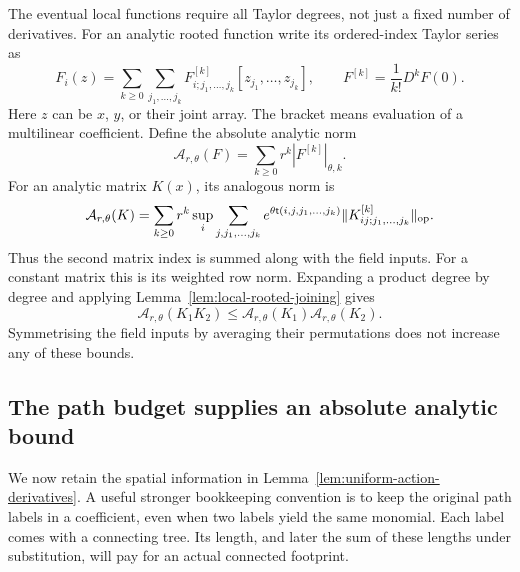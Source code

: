 \documentclass[11pt,reqno]{amsart}
\numberwithin{equation}{section}
\theoremstyle{definition}
\theoremstyle{remark}
\begin{document}
The eventual local functions require all Taylor
degrees, not just a fixed number of derivatives.
For an analytic rooted function write its ordered-index
Taylor series as
\[
 F_i(z)=\sum_{k\ge0}\sum_{j_1,\ldots,j_k}
       F^{[k]}_{i;j_1,\ldots,j_k}
                         [z_{j_1},\ldots,z_{j_k}],
 \qquad
 F^{[k]}=\frac1{k!}D^kF(0).
\]
Here \(z\) can be \(x\), \(y\), or their joint array.
The bracket means evaluation of a multilinear coefficient.
Define the absolute analytic norm
\begin{equation}
             \mathcal A_{r,\theta}(F)
                  =\sum_{k\ge0}r^k|F^{[k]}|_{\theta,k}.
 \label{eq:local-analytic-norm}
\end{equation}
For an analytic matrix \(K(x)\), its analogous norm is
\begin{equation}
 \mathcal A_{r,\theta}(K)
  =\sum_{k\ge0}r^k\sup_i
     \sum_{j,j_1,\ldots,j_k}
       e^{\theta\mathsf t(i,j,j_1,\ldots,j_k)}
                    \|K^{[k]}_{ij;j_1,\ldots,j_k}\|_{\rm op}.
 \label{eq:local-analytic-matrix}
\end{equation}
Thus the second matrix index is summed along with the
field inputs. For a constant matrix this is its
weighted row norm.
Expanding a product degree by degree and applying
Lemma~\ref{lem:local-rooted-joining} gives
\begin{equation}
 \mathcal A_{r,\theta}(K_1K_2)
        \le\mathcal A_{r,\theta}(K_1)
                             \mathcal A_{r,\theta}(K_2).
 \label{eq:local-analytic-product}
\end{equation}
Symmetrising the field inputs by averaging their
permutations does not increase any of these bounds.

\subsection{The path budget supplies an absolute analytic bound}

We now retain the spatial information in
Lemma~\ref{lem:uniform-action-derivatives}.
A useful stronger bookkeeping convention is to keep
the original path labels in a coefficient, even when
two labels yield the same monomial.
Each label comes with a connecting tree. Its length,
and later the sum of these lengths under substitution,
will pay for an actual connected footprint.
\end{document}
